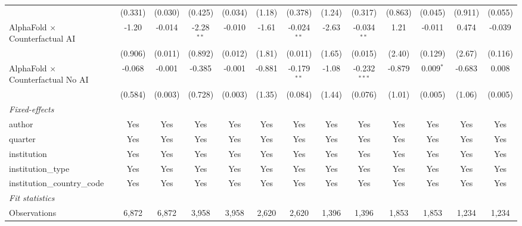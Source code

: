 \begin{tabular}{lcccccccccccc}
                                            & (0.331) & (0.030) & (0.425)      & (0.034) & (1.18)      & (0.378)       & (1.24)      & (0.317)        & (0.863) & (0.045)      & (0.911) & (0.055)\\   
   AlphaFold $\times$ Counterfactual AI     & -1.20   & -0.014  & -2.28$^{**}$ & -0.010  & -1.61       & -0.024$^{**}$ & -2.63       & -0.034$^{**}$  & 1.21    & -0.011       & 0.474   & -0.039\\   
                                            & (0.906) & (0.011) & (0.892)      & (0.012) & (1.81)      & (0.011)       & (1.65)      & (0.015)        & (2.40)  & (0.129)      & (2.67)  & (0.116)\\   
   AlphaFold $\times$ Counterfactual No AI  & -0.068  & -0.001  & -0.385       & -0.001  & -0.881      & -0.179$^{**}$ & -1.08       & -0.232$^{***}$ & -0.879  & 0.009$^{*}$  & -0.683  & 0.008\\   
                                            & (0.584) & (0.003) & (0.728)      & (0.003) & (1.35)      & (0.084)       & (1.44)      & (0.076)        & (1.01)  & (0.005)      & (1.06)  & (0.005)\\   
   \midrule
   \emph{Fixed-effects}\\
   author                                   & Yes     & Yes     & Yes          & Yes     & Yes         & Yes           & Yes         & Yes            & Yes     & Yes          & Yes     & Yes\\  
   quarter                                  & Yes     & Yes     & Yes          & Yes     & Yes         & Yes           & Yes         & Yes            & Yes     & Yes          & Yes     & Yes\\  
   institution                              & Yes     & Yes     & Yes          & Yes     & Yes         & Yes           & Yes         & Yes            & Yes     & Yes          & Yes     & Yes\\  
   institution\_type                        & Yes     & Yes     & Yes          & Yes     & Yes         & Yes           & Yes         & Yes            & Yes     & Yes          & Yes     & Yes\\  
   institution\_country\_code               & Yes     & Yes     & Yes          & Yes     & Yes         & Yes           & Yes         & Yes            & Yes     & Yes          & Yes     & Yes\\  
   \midrule
   \emph{Fit statistics}\\
   Observations                             & 6,872   & 6,872   & 3,958        & 3,958   & 2,620       & 2,620         & 1,396       & 1,396          & 1,853   & 1,853        & 1,234   & 1,234\\  

\end{tabular}
